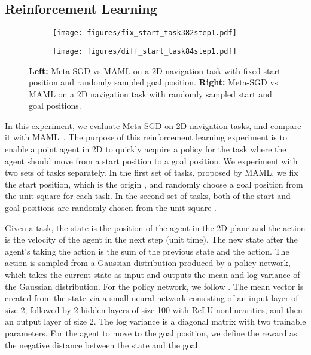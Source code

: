 \documentclass{article}
\begin{document}
 
\subsection{Reinforcement Learning}


\begin{figure*}[t]
	\centering
	\begin{subfigure}{0.49\textwidth}
		\centering
		\texttt{[image: figures/fix\_start\_task382step1.pdf]}
	\end{subfigure}
	\begin{subfigure}{0.49\textwidth}
		\centering
		\texttt{[image: figures/diff\_start\_task84step1.pdf]}
	\end{subfigure}
	
	\caption{\textbf{Left:} Meta-SGD vs MAML on a 2D navigation task with fixed start position and randomly sampled goal position. \textbf{Right:} Meta-SGD vs MAML on a 2D navigation task with randomly sampled start and goal positions. }
	\label{fig:reinforcement_pictures}\vspace{-0.0cm}
\end{figure*}

In this experiment, we evaluate Meta-SGD on 2D navigation tasks, and compare it with MAML~\cite{finn2017model}. The purpose of this reinforcement learning experiment is to enable a point agent in 2D to quickly acquire a policy for the task where the agent should move from a start position to a goal position. We experiment with two sets of tasks separately. In the first set of tasks, proposed by MAML, we fix the start position, which is the origin , and randomly choose a goal position from the unit square  for each task. In the second set of tasks, both of the start and goal positions are randomly chosen from the unit square .

Given a task, the state is the position of the agent in the 2D plane and the action is the velocity of the agent in the next step (unit time). The new state after the agent's taking the action is the sum of the previous state and the action. The action is sampled from a Gaussian distribution produced by a policy network, which takes the current state as input and outputs the mean and log variance of the Gaussian distribution. For the policy network, we follow \cite{finn2017model}. The mean vector is created from the state via a small neural network consisting of an input layer of size 2, followed by 2 hidden layers of size 100 with ReLU nonlinearities, and then an output layer of size 2. The log variance is a diagonal matrix with two trainable parameters. For the agent to move to the goal position, we define the reward as the negative distance between the state and the goal.
\end{document}
